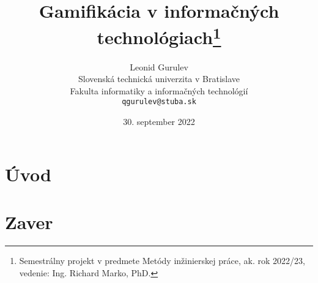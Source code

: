 \documentclass[14pt,twoside,a4paper]{article}
\title{Gamifikácia v informačných technológiach\thanks{Semestrálny projekt v predmete Metódy inžinierskej práce, ak. rok 2022/23, vedenie: Ing. Richard Marko, PhD.}}
\author{Leonid Gurulev\\[2pt]
	{\small Slovenská technická univerzita v Bratislave}\\
	{\small Fakulta informatiky a informačných technológií}\\
	{\small \texttt{qgurulev@stuba.sk}}
	}
\date{\small 30. september 2022}
\begin{document}
\maketitle

\begin{abstract}

\end{abstract}

\section{Úvod}


\section{Zaver}





\end{document}
